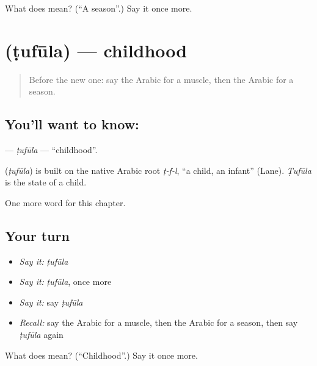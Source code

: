 \begin{tcolorbox}[breakable,colback=teal!4,colframe=teal!35!black,title={Before you move on}]
What does  mean? (\textquotedblleft{}A season\textquotedblright{}.) Say it once more.
\end{tcolorbox}
\section[\texorpdfstring{\ar{طفولة} (ṭufūla)}{طفولة (ṭufūla)}]{ (ṭufūla) — childhood}

\label{lesson:AR-C264-tufula}



\begin{quote}
Before the new one: say the Arabic for a muscle, then the Arabic for a season.
\end{quote}

\subsection*{You'll want to know: }
\textbf{} — \emph{ṭufūla} — \textquotedblleft{}childhood\textquotedblright{}.

\begin{cousinweb}
\textbf{} (\emph{ṭufūla}) is built on the native Arabic root \emph{ṭ-f-l}, \textquotedblleft{}a child, an infant\textquotedblright{} (Lane). \emph{Ṭufūla} is the state of a child.
\end{cousinweb}

\begin{grammarlens}[title={What you've built}]
One more word for this chapter.
\end{grammarlens}

\subsection*{Your turn}
\begin{itemize}
\raggedright
  \item \emph{Say it:} \emph{ṭufūla}
  \item \emph{Say it:} \emph{ṭufūla}, once more
  \item \emph{Say it:} say \emph{ṭufūla}
  \item \emph{Recall:} say the Arabic for a muscle, then the Arabic for a season, then say \emph{ṭufūla} again
\end{itemize}

\begin{tcolorbox}[breakable,colback=teal!4,colframe=teal!35!black,title={Before you move on}]
What does  mean? (\textquotedblleft{}Childhood\textquotedblright{}.) Say it once more.
\end{tcolorbox}
